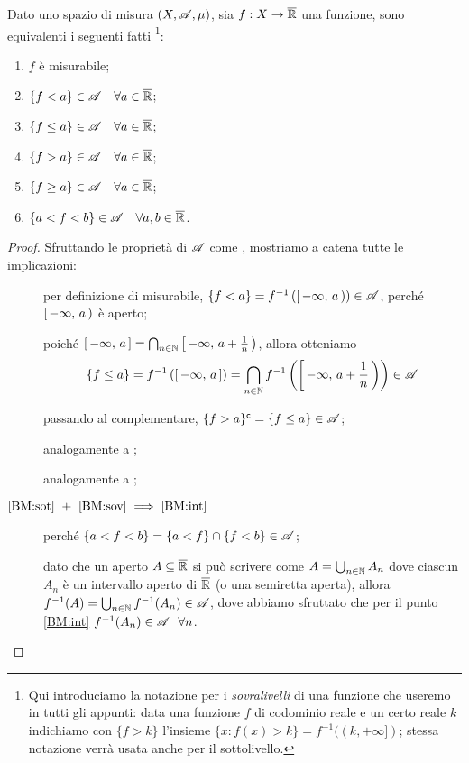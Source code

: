 \begin{proposition}\label{prop:BasicMis}
	Dato uno spazio di misura $(X,\mathscr A,\mu)$, sia $f:X\rightarrow \overline{\mathbb R}$ una funzione, sono equivalenti i seguenti fatti
	\footnote{Qui introduciamo la notazione per i \textit{sovralivelli} di una funzione che useremo in tutti gli appunti:
		data una funzione $f$ di codominio reale e un certo reale $k$ indichiamo con $\{f>k\}$ l'insieme
		$\{x:f(x)>k\}=f^{-1}((k,+\infty])$; stessa notazione verrà usata anche per il sottolivello.}:
	\begin{enumerate}[label=(\arabic*),ref=(\arabic*)]
		\item $f$ è misurabile; \label{BM:mis}
		\item $\{f<a\}\in \mathscr A \quad \forall a\in \overline{\mathbb R}$; \label{BM:sot}
		\item $\{f\le a\}\in \mathscr A \quad \forall a\in \overline{\mathbb R}$; \label{BM:soteq}
		\item $\{f>a\}\in \mathscr A \quad \forall a\in \overline{\mathbb R}$; \label{BM:sov}
		\item $\{f\ge a\}\in \mathscr A \quad \forall a\in \overline{\mathbb R}$;  \label{BM:soveq}
		\item $\{a<f<b\}\in \mathscr A \quad \forall a,b\in \overline{\mathbb R}$. \label{BM:int}
	\end{enumerate}
\end{proposition}
\begin{proof}
	Sfruttando le proprietà di $\mathscr A$ come \sigalg, mostriamo a catena tutte le implicazioni:
	\begin{description}
	\item[] per definizione di misurabile, $\{f<a\}=f^{-1}\left(\left[\,-\infty,\,a\,\right)\right)\in \mathscr A$,
		perché $\left[\,-\infty,\,a\,\right)$ è aperto;
	\item[] poiché $\left[\,-\infty,\,a\,\right]=\bigcap_{n\in \mathbb N}\left[\,-\infty,\,a+\frac{1}{n}\,\right)$, allora otteniamo
		\begin{equation*}
			\{f\le a\}=f^{-1}\left(\left[\,-\infty,\,a\,\right]\right)=\bigcap_{n\in \mathbb N}f^{-1}\left(\left[\,-\infty,\,a+\frac{1}{n}\,\right)\right)\in \mathscr A	
		\end{equation*}

	\item[] passando al complementare, $\{f>a\}^\mathsf{c}=\{f\le a\}\in \mathscr A$;
	\item[] analogamente a ; 
	\item[] analogamente a ;
	\item[$\text{\ref{BM:sot}}\ +\ \text{\ref{BM:sov}}\implies\text{\ref{BM:int}}$] perché
		$\{a<f<b\}=\{a<f\}\cap\{f<b\}\in \mathscr A$;
	\item[] dato che un aperto $A\subseteq\overline{\mathbb R}$ si può scrivere come
		$A=\bigcup_{n\in \mathbb N}A_n$ dove ciascun $A_n$ è un intervallo aperto di $\overline{\mathbb R}$ (o una semiretta aperta),
		allora $f^{-1}(A)=\bigcup_{n\in \mathbb N}f^{-1}(A_n)\in \mathscr A$, dove abbiamo sfruttato che per il punto \ref{BM:int} $f^{-1}(A_n)\in \mathscr A\ \ \forall n$.
	\end{description}
\end{proof}

